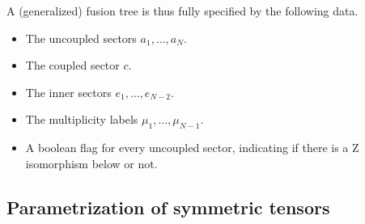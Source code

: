 A (generalized) fusion tree is thus fully specified by the following data.
\begin{itemize}
    \item The uncoupled sectors $a_1,\dots,a_N$.
    \item The coupled sector $c$.
    \item The inner sectors $e_1,\dots,e_{N-2}$.
    \item The multiplicity labels $\mu_1,\dots,\mu_{N-1}$.
    \item A boolean flag for every uncoupled sector, indicating if there is a Z isomorphism below or not.
\end{itemize}

\subsection{Parametrization of symmetric tensors}
\label{subsec:nonabelian:tensors:parametrization}

